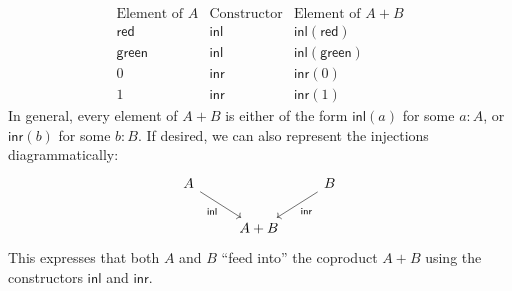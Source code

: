 \documentclass{article}
\newcommand{\inl}{\mathsf{inl}}
\newcommand{\inr}{\mathsf{inr}}
\begin{document}
\[
\begin{array}{c|c|c}
\text{Element of } A & \text{Constructor} & \text{Element of } A + B \\ \hline
\mathsf{red} & \inl & \inl(\mathsf{red}) \\
\mathsf{green} & \inl & \inl(\mathsf{green}) \\ \hline
0 & \inr & \inr(0) \\
1 & \inr & \inr(1)
\end{array}
\]
In general, every element of \(A + B\) is either of the form
\(\inl(a)\) for some \(a : A\), or \(\inr(b)\) for some \(b : B\). If desired, we can also represent the injections diagrammatically:
\[
\begin{tikzcd}
A \arrow[dr, "\inl"'] & & B \arrow[dl, "\inr"] \\
& A + B &
\end{tikzcd}
\]
This expresses that both \(A\) and \(B\) “feed into” the coproduct \(A + B\) using the constructors $\inl$ and $\inr$.
\end{document}
